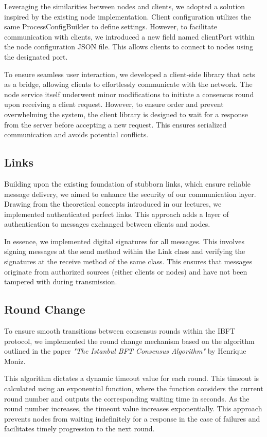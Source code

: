 \documentclass[12pt]{article}
\begin{document}
Leveraging the similarities between nodes and clients, we adopted a solution inspired by the existing node implementation. Client configuration utilizes the same ProcessConfigBuilder to define settings. However, to facilitate communication with clients, we introduced a new field named clientPort within the node configuration JSON file. This allows clients to connect to nodes using the designated port.

To ensure seamless user interaction, we developed a client-side library that acts as a bridge, allowing clients to effortlessly communicate with the network.  The node service itself underwent minor modifications to initiate a consensus round upon receiving a client request. However, to ensure order and prevent overwhelming the system, the client library is designed to wait for a response from the server before accepting a new request. This ensures serialized communication and avoids potential conflicts.

\subsection{Links}
Building upon the existing foundation of stubborn links, which ensure reliable message delivery, we aimed to enhance the security of our communication layer. Drawing from the theoretical concepts introduced in our lectures, we implemented authenticated perfect links. This approach adds a layer of authentication to messages exchanged between clients and nodes.

In essence, we implemented digital signatures for all messages. This involves signing messages at the send method within the Link class and verifying the signatures at the receive method of the same class. This ensures that messages originate from authorized sources (either clients or nodes) and have not been tampered with during transmission.

\subsection{Round Change}

To ensure smooth transitions between consensus rounds within the IBFT protocol, we implemented the round change mechanism based on the algorithm outlined in the paper \textit{"The Istanbul BFT Consensus Algorithm"} by Henrique Moniz.

This algorithm dictates a dynamic timeout value for each round. This timeout is calculated using an exponential function, where the function considers the current round number and outputs the corresponding waiting time in seconds.  As the round number increases, the timeout value increases exponentially. This approach prevents nodes from waiting indefinitely for a response in the case of failures and facilitates timely progression to the next round.
\end{document}
